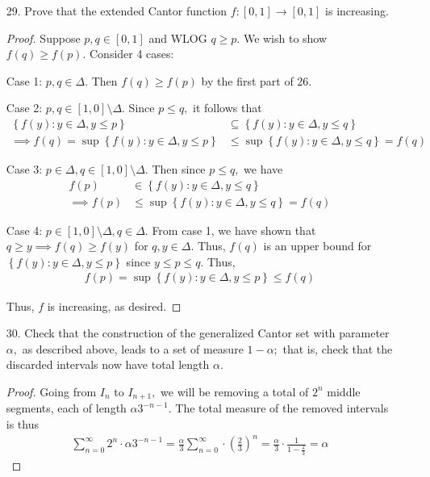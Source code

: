\documentclass{article}
\begin{document}
\begin{itemize}
	\item[29.] Prove that the extended Cantor function $f:[0, 1]\to [0, 1]$ is increasing.
		\begin{proof}
			Suppose $p, q\in [0, 1]$ and WLOG $q\ge p.$ We wish to show $f(q)\ge f(p).$ Consider 4 cases:
			
			Case 1: $p, q\in \Delta.$ Then $f(q)\ge f(p)$ by the first part of 26.

			Case 2: $p, q\in [1, 0]\setminus \Delta.$ Since $p\le q,$ it follows that
			\begin{align*}
				\left\{ f(y):y\in \Delta, y\le p \right\} &\subseteq \left\{ f(y):y\in \Delta, y\le q \right\} \\
				\implies f(q) = \sup\left\{ f(y):y\in \Delta, y\le p \right\} &\le \sup\left\{ f(y):y\in \Delta, y\le q \right\} = f(q)
			\end{align*}

			Case 3: $p\in \Delta, q\in [1, 0]\setminus \Delta.$ Then since $p\le q,$ we have
			\begin{align*}
				f(p)&\in \left\{ f(y):y\in \Delta, y\le q \right\} \\
				\implies f(p)&\le \sup\left\{ f(y):y\in \Delta, y\le q \right\} = f(q)
			\end{align*}

			Case 4: $p\in [1, 0]\setminus \Delta, q\in \Delta.$ From case 1, we have shown that $q\ge y\implies f(q)\ge f(y)$ for $q, y\in \Delta.$ Thus, $f(q)$ is an upper bound for $\left\{ f(y):y\in\Delta, y\le p \right\}$ since $y\le p\le q.$ Thus,
			\begin{align*}
				f(p)=\sup\left\{ f(y):y\in \Delta, y\le p \right\} \le f(q)
			\end{align*}

			Thus, $f$ is increasing, as desired.
		\end{proof}

	\item[30.] Check that the construction of the generalized Cantor set with parameter $\alpha,$ as described above, leads to a set of measure $1-\alpha;$ that is, check that the discarded intervals now have total length $\alpha.$
		\begin{proof}
			Going from $I_n$ to $I_{n+1},$ we will be removing a total of $2^{n}$ middle segments, each of length $\alpha 3^{-n-1}.$ The total measure of the removed intervals is thus
			\begin{align*}
				\sum_{n=0}^{\infty} 2^{n}\cdot \alpha 3^{-n-1} = \frac{\alpha}{3}\sum_{n=0}^{\infty}\cdot\left( \frac{2}{3} \right)^n = \frac{\alpha}{3}\cdot \frac{1}{1-\frac{2}{3}} = \alpha
			\end{align*}
		\end{proof}


\end{itemize}
\end{document}
